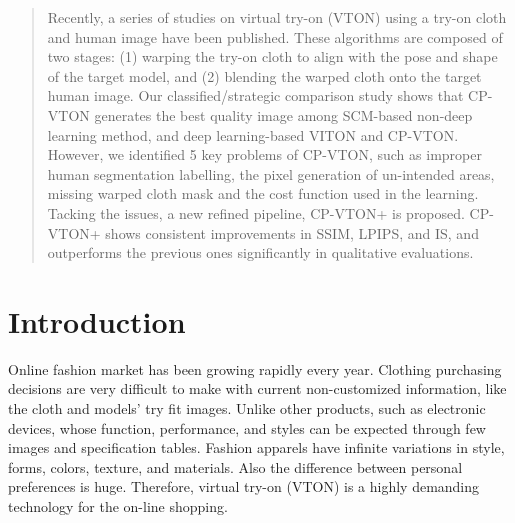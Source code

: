 \documentclass[runningheads]{llncs}
\begin{document}
\begin{abstract}

Recently, a series of studies on virtual try-on (VTON) using a try-on cloth and human image have been published. These algorithms are composed of two stages: (1) warping the try-on cloth to align with the pose and shape of the target model, and (2) blending the warped cloth onto the target human image. Our classified/strategic comparison study shows that CP-VTON generates the best quality image among SCM-based non-deep learning method, and deep learning-based VITON and CP-VTON. However, we identified 5 key problems of CP-VTON, such as improper human segmentation labelling, the pixel generation of un-intended areas, missing warped cloth mask and the cost function used in the learning. Tacking the issues, a new refined pipeline, CP-VTON+ is proposed. CP-VTON+ shows consistent improvements in SSIM, LPIPS, and IS, and outperforms the previous ones significantly in qualitative evaluations.


\end{abstract}


\section{Introduction}

Online fashion market has been growing rapidly every year. Clothing purchasing decisions are very difficult to make with current non-customized information, like the cloth and models' try fit images. Unlike other products, such as electronic devices, whose function, performance, and styles can be expected through few images and specification tables. Fashion apparels have infinite variations in style, forms, colors, texture, and materials.  Also the difference between personal preferences is huge. Therefore, virtual try-on (VTON) is a highly demanding technology for the on-line shopping. 
\end{document}
